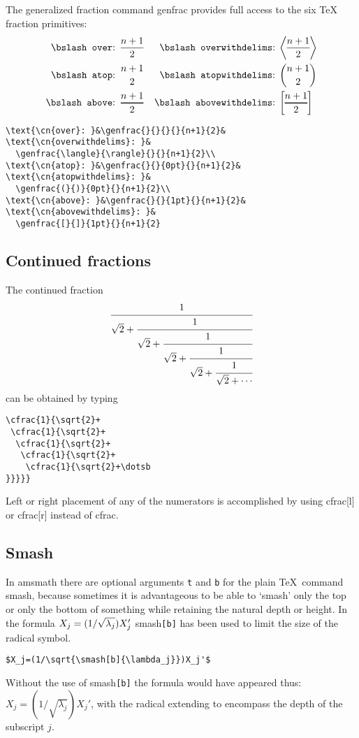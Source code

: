\documentclass{article}
\DeclareRobustCommand*\ntt{\normalfont\ttfamily}
\newcommand{\cn}[1]{{\ntt\bslash#1}}
\newcommand{\pkg}[1]{{\ntt#1}}
\theoremstyle{definition}
\theoremstyle{remark}
\begin{document}
The generalized fraction command \cn{genfrac} provides full access to
the six \TeX{} fraction primitives:
\begin{align}
\text{\cn{over}: }&\genfrac{}{}{}{}{n+1}{2}&
\text{\cn{overwithdelims}: }&
  \genfrac{\langle}{\rangle}{}{}{n+1}{2}\\
\text{\cn{atop}: }&\genfrac{}{}{0pt}{}{n+1}{2}&
\text{\cn{atopwithdelims}: }&
  \genfrac{(}{)}{0pt}{}{n+1}{2}\\
\text{\cn{above}: }&\genfrac{}{}{1pt}{}{n+1}{2}&
\text{\cn{abovewithdelims}: }&
  \genfrac{[}{]}{1pt}{}{n+1}{2}
\end{align}
\begin{verbatim}
\text{\cn{over}: }&\genfrac{}{}{}{}{n+1}{2}&
\text{\cn{overwithdelims}: }&
  \genfrac{\langle}{\rangle}{}{}{n+1}{2}\\
\text{\cn{atop}: }&\genfrac{}{}{0pt}{}{n+1}{2}&
\text{\cn{atopwithdelims}: }&
  \genfrac{(}{)}{0pt}{}{n+1}{2}\\
\text{\cn{above}: }&\genfrac{}{}{1pt}{}{n+1}{2}&
\text{\cn{abovewithdelims}: }&
  \genfrac{[}{]}{1pt}{}{n+1}{2}
\end{verbatim}

\subsection{Continued fractions}
The continued fraction
\begin{equation}
\cfrac{1}{\sqrt{2}+
 \cfrac{1}{\sqrt{2}+
  \cfrac{1}{\sqrt{2}+
   \cfrac{1}{\sqrt{2}+
    \cfrac{1}{\sqrt{2}+\dotsb
}}}}}
\end{equation}
can be obtained by typing
\begin{verbatim}
\cfrac{1}{\sqrt{2}+
 \cfrac{1}{\sqrt{2}+
  \cfrac{1}{\sqrt{2}+
   \cfrac{1}{\sqrt{2}+
    \cfrac{1}{\sqrt{2}+\dotsb
}}}}}
\end{verbatim}
Left or right placement of any of the numerators is accomplished by using
\cn{cfrac[l]} or \cn{cfrac[r]} instead of \cn{cfrac}.

\subsection{Smash}

In \pkg{amsmath} there are optional arguments \verb"t" and \verb"b" for
the plain \TeX\ command \cn{smash}, because sometimes it is advantageous
to be able to `smash' only the top or only the bottom of something while
retaining the natural depth or height. In the formula
$X_j=(1/\sqrt{\smash[b]{\lambda_j}})X_j'$ \cn{smash}\verb=[b]= has been
used to limit the size of the radical symbol.
\begin{verbatim}
$X_j=(1/\sqrt{\smash[b]{\lambda_j}})X_j'$
\end{verbatim}
Without the use of \cn{smash}\verb=[b]= the formula would have appeared
thus: $X_j=(1/\sqrt{\lambda_j})X_j'$, with the radical extending to
encompass the depth of the subscript $j$.
\end{document}
